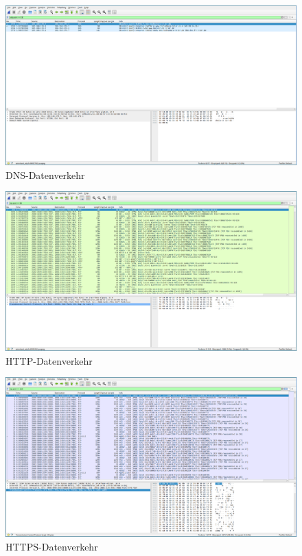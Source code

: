 \begin{figure}[p]
    \centering
    \includegraphics[width=1\textwidth]{./assets/5.1.a.dns.png}
    \caption{DNS-Datenverkehr}
    \label{fig:5.1.a.dns}
\end{figure}

\FloatBarrier

\begin{figure}[p]
    \centering
    \includegraphics[width=1\textwidth]{./assets/5.1.a.http.png}
    \caption{HTTP-Datenverkehr}
    \label{fig:5.1.a.http}
\end{figure}

\begin{figure}[p]
    \centering
    \includegraphics[width=1\textwidth]{./assets/5.1.a.https.png}
    \caption{HTTPS-Datenverkehr}
    \label{fig:5.1.a.https}
\end{figure}

